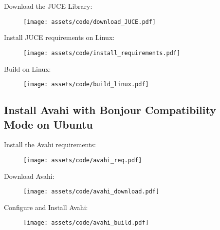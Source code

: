 Download the JUCE Library:
\vspace{-1em}
\begin{figure}[H]
    \centering
    \texttt{[image: assets/code/download\_JUCE.pdf]}
    \label{fig:juce}
    \vspace{-2.5em}
\end{figure}
\noindent
Install JUCE requirements on Linux:
\vspace{-1em}
\begin{figure}[H]
    \centering
    \texttt{[image: assets/code/install\_requirements.pdf]}
    \label{fig:juce}
    \vspace{-2.5em}
\end{figure}
\noindent
Build on Linux:
\vspace{-1em}
\begin{figure}[H]
    \centering
    \texttt{[image: assets/code/build\_linux.pdf]}
    \label{fig:juce}
    \vspace{-2.5em}
\end{figure}

\subsection{Install Avahi with Bonjour Compatibility Mode on Ubuntu}
Install the Avahi requirements:
\vspace{-1em}
\begin{figure}[H]
    \centering
    \texttt{[image: assets/code/avahi\_req.pdf]}
    \label{fig:juce}
    \vspace{-2.5em}
\end{figure}
\noindent
Download Avahi:
\vspace{-1em}
\begin{figure}[H]
    \centering
    \texttt{[image: assets/code/avahi\_download.pdf]}
    \label{fig:juce}
    \vspace{-2.5em}
\end{figure}
\noindent
Configure and Install Avahi:
\vspace{-1em}
\begin{figure}[H]
    \centering
    \texttt{[image: assets/code/avahi\_build.pdf]}
    \label{fig:juce}
    \vspace{-2.5em}
\end{figure}
